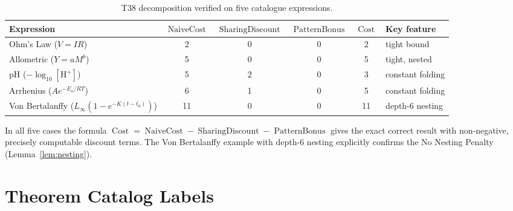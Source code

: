 \documentclass[12pt,a4paper]{article}
\theoremstyle{definition}
\newcommand{\Cost}{\operatorname{Cost}}
\newcommand{\NC}{\operatorname{NaiveCost}}
\newcommand{\SD}{\operatorname{SharingDiscount}}
\newcommand{\PB}{\operatorname{PatternBonus}}
\begin{document}
\begin{table}[h]
\centering
\caption{T38 decomposition verified on five catalogue expressions.}
\label{tab:examples}
\smallskip
\begin{tabular}{@{}lccccl@{}}
\toprule
\textbf{Expression} & $\NC$ & $\SD$ & $\PB$ & $\Cost$ & \textbf{Key feature} \\
\midrule
Ohm's Law ($V=IR$)                 &  2 & 0 & 0 &  2 & tight bound \\
Allometric ($Y=aM^b$)              &  5 & 0 & 0 &  5 & tight, nested \\
pH ($-\log_{10}[\mathrm{H}^+]$)   &  5 & 2 & 0 &  3 & constant folding \\
Arrhenius ($Ae^{-E_a/RT}$)         &  6 & 1 & 0 &  5 & constant folding \\
Von Bertalanffy ($L_\infty(1-e^{-K(t-t_0)})$) & 11 & 0 & 0 & 11 & depth-6 nesting \\
\bottomrule
\end{tabular}
\end{table}

In all five cases the formula $\Cost = \NC - \SD - \PB$ gives the exact
correct result with non-negative, precisely computable discount terms.
The Von Bertalanffy example with depth-6 nesting explicitly confirms the
No Nesting Penalty (Lemma~\ref{lem:nesting}).

\section{Theorem Catalog Labels}
\label{sec:catalog}
\end{document}
